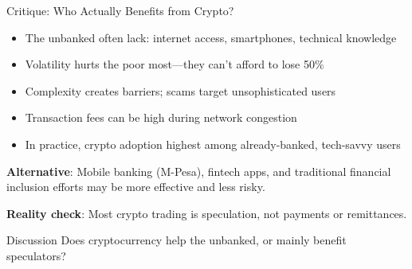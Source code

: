 ﻿\documentclass[aspectratio=169,11pt]{beamer}
\begin{document}
\begin{frame}{Critique: Who Actually Benefits from Crypto?}
\begin{objectionbox}
\begin{itemize}
    \item The unbanked often lack: internet access, smartphones, technical knowledge
    \item Volatility hurts the poor most---they can't afford to lose 50\%
    \item Complexity creates barriers; scams target unsophisticated users
    \item Transaction fees can be high during network congestion
    \item In practice, crypto adoption highest among already-banked, tech-savvy users
\end{itemize}
\end{objectionbox}

\vspace{0.3em}
\textbf{Alternative}: Mobile banking (M-Pesa), fintech apps, and traditional financial inclusion efforts may be more effective and less risky.

\textbf{Reality check}: Most crypto trading is speculation, not payments or remittances.

\begin{alertblock}{Discussion}
Does cryptocurrency help the unbanked, or mainly benefit speculators?
\end{alertblock}
\end{frame}
\end{document}
